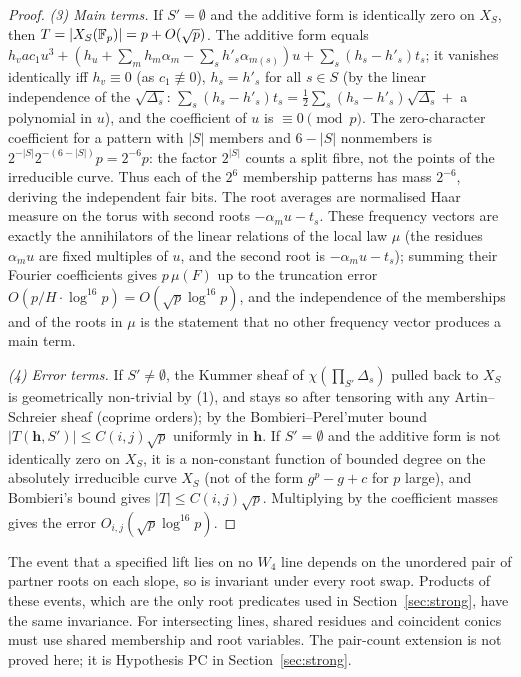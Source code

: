 \begin{proof}
\emph{(3) Main terms.}  If $S'=\emptyset$ and the additive form is identically zero on $X_S$, then $T=|X_S(\mathbb{F}_p)|=p+O(\sqrt p)$.  The additive form
equals $h_vac_1u^3+(h_u+\sum_mh_m\alpha_m-\sum_sh'_s\alpha_{m(s)})u+\sum_s(h_s-h'_s)t_s$; it vanishes identically iff $h_v\equiv0$ (as $c_1\not\equiv0$),
$h_s=h'_s$ for all $s\in S$ (by the linear independence of the $\sqrt{\Delta_s}$: $\sum_s(h_s-h'_s)t_s=\tfrac12\sum_s(h_s-h'_s)\sqrt{\Delta_s}+$ a polynomial in $u$),
and the coefficient of $u$ is $\equiv0\pmod p$.  The zero-character coefficient for a pattern with $|S|$ members and $6-|S|$ nonmembers is
$2^{-|S|}2^{-(6-|S|)}p=2^{-6}p$: the factor $2^{|S|}$ counts a split fibre, not the points of the irreducible curve.
Thus each of the $2^6$ membership patterns has mass $2^{-6}$, deriving the independent fair bits.
The root averages are normalised Haar measure on the torus with second roots $-\alpha_mu-t_s$.
These frequency vectors are exactly the annihilators of the linear relations of the local law $\mu$
(the residues $\alpha_mu$ are fixed multiples of $u$, and the second root is $-\alpha_mu-t_s$); summing their Fourier coefficients gives $p\,\mu(F)$ up to the
truncation error $O(p/H\cdot\log^{16}p)=O(\sqrt p\log^{16}p)$, and the independence of the memberships and of the roots in $\mu$ is the statement that no other
frequency vector produces a main term.

\emph{(4) Error terms.}  If $S'\ne\emptyset$, the Kummer sheaf of $\chi(\prod_{S'}\Delta_s)$ pulled back to $X_S$ is geometrically non-trivial by (1), and stays
so after tensoring with any Artin--Schreier sheaf (coprime orders); by the Bombieri--Perel'muter bound \cite{Perelmuter,CastroMoreno} $|T(\mathbf h,S')|\le
C(i,j)\sqrt p$ uniformly in $\mathbf h$.  If $S'=\emptyset$ and the additive form is not identically zero on $X_S$, it is a non-constant function of bounded degree
on the absolutely irreducible curve $X_S$ (not of the form $g^p-g+c$ for $p$ large), and Bombieri's bound \cite{Bombieri66} gives $|T|\le C(i,j)\sqrt p$.
Multiplying by the coefficient masses gives the error $O_{i,j}(\sqrt p\log^{16}p)$.
\end{proof}
\begin{remark}
The event that a specified lift lies on no $W_4$ line depends on the unordered pair of partner roots on each slope, so is invariant under every root swap.
Products of these events, which are the only root predicates used in Section~\ref{sec:strong}, have the same invariance.
For intersecting lines, shared residues and coincident conics must use shared membership and root variables.
The pair-count extension is not proved here; it is Hypothesis PC in Section~\ref{sec:strong}.
\end{remark}
